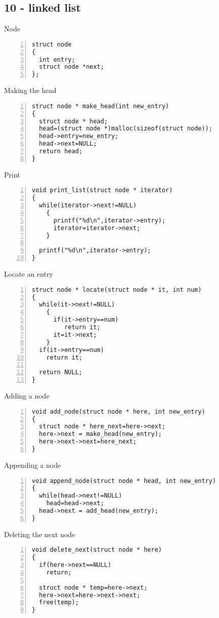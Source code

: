 \documentclass{beamer}
\begin{document}
\subsection*{10 - linked list}
\begin{frame}[fragile]{Node}
\begin{lstlisting}[numbers=left]
struct node
{
  int entry;
  struct node *next;
};
\end{lstlisting}
\end{frame}
\begin{frame}[fragile]{Making the head}
\begin{lstlisting}[numbers=left]
struct node * make_head(int new_entry)
{
  struct node * head;
  head=(struct node *)malloc(sizeof(struct node));
  head->entry=new_entry;
  head->next=NULL;
  return head;
}
\end{lstlisting}
\end{frame}
\begin{frame}[fragile]{Print}
\begin{lstlisting}[numbers=left]
void print_list(struct node * iterator)
{
  while(iterator->next!=NULL)
    {
      printf("%d\n",iterator->entry);
      iterator=iterator->next;
    }

  printf("%d\n",iterator->entry);
}
\end{lstlisting}
\end{frame}
\begin{frame}[fragile]{Locate an entry}
\begin{lstlisting}[numbers=left]
struct node * locate(struct node * it, int num)
{
  while(it->next!=NULL)
    {
      if(it->entry==num)
         return it;
      it=it->next;
    }
  if(it->entry==num)
    return it;

  return NULL;
}
\end{lstlisting}
\end{frame}
\begin{frame}[fragile]{Adding a node}
\begin{lstlisting}[numbers=left]
void add_node(struct node * here, int new_entry)
{
  struct node * here_next=here->next;
  here->next = make_head(new_entry);
  here->next->next=here_next;
}
\end{lstlisting}
\end{frame}
\begin{frame}[fragile]{Appending a node}
\begin{lstlisting}[numbers=left]
void append_node(struct node * head, int new_entry)
{
  while(head->next!=NULL)
    head=head->next;
  head->next = add_head(new_entry);
}
\end{lstlisting}
\end{frame}
\begin{frame}[fragile]{Deleting the next node}
\begin{lstlisting}[numbers=left]
void delete_next(struct node * here)
{
  if(here->next==NULL)
    return;

  struct node * temp=here->next;
  here->next=here->next->next;
  free(temp);
}
\end{lstlisting}
\end{frame}
\end{document}
